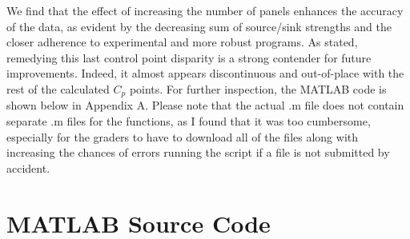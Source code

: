 \documentclass[12pt]{article}
\begin{document}
\noindent We find that the effect of increasing the number of panels enhances the accuracy of the data, as evident by the decreasing sum of source/sink strengths and the closer adherence to experimental and more robust programs. As stated, remedying this last control point disparity is a strong contender for future improvements. Indeed, it almost appears discontinuous and out-of-place with the rest of the calculated $C_p$ points. For further inspection, the MATLAB code is shown below in Appendix A. Please note that the actual .m file does not contain separate .m files for the functions, as I found that it was too cumbersome, especially for the graders to have to download all of the files along with increasing the chances of errors running the script if a file is not submitted by accident.

\appendix
\section{MATLAB Source Code}
\end{document}
